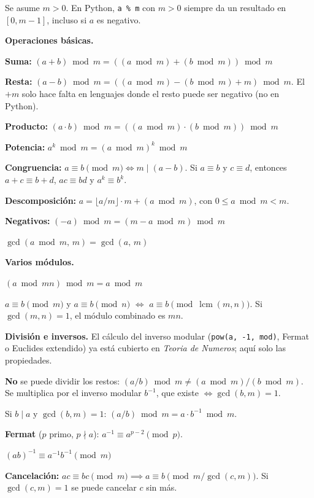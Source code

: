 Se asume \(m > 0\). En Python, \texttt{a \% m} con \(m > 0\) siempre da un resultado en \([0, m-1]\), incluso si \(a\) es negativo.

\textbf{Operaciones básicas.}
\begin{props}
  \item \textbf{Suma:} \((a+b) \bmod m = ((a \bmod m) + (b \bmod m)) \bmod m\)
  \item \textbf{Resta:} \((a-b) \bmod m = ((a \bmod m) - (b \bmod m) + m) \bmod m\). El \(+m\) solo hace falta en lenguajes donde el resto puede ser negativo (no en Python).
  \item \textbf{Producto:} \((a \cdot b) \bmod m = ((a \bmod m) \cdot (b \bmod m)) \bmod m\)
  \item \textbf{Potencia:} \(a^k \bmod m = (a \bmod m)^k \bmod m\)
  \item \textbf{Congruencia:} \(a \equiv b \pmod m \iff m \mid (a-b)\). Si \(a \equiv b\) y \(c \equiv d\), entonces \(a+c \equiv b+d\), \(ac \equiv bd\) y \(a^k \equiv b^k\).
  \item \textbf{Descomposición:} \(a = \lfloor a/m \rfloor \cdot m + (a \bmod m)\), con \(0 \le a \bmod m < m\).
  \item \textbf{Negativos:} \((-a) \bmod m = (m - a \bmod m) \bmod m\)
  \item \(\gcd(a \bmod m,\, m) = \gcd(a,\, m)\)
\end{props}

\textbf{Varios módulos.}
\begin{props}
  \item \((a \bmod mn) \bmod m = a \bmod m\)
  \item \(a \equiv b \pmod m\) y \(a \equiv b \pmod n\) \(\iff\) \(a \equiv b \pmod{\operatorname{lcm}(m,n)}\). Si \(\gcd(m,n)=1\), el módulo combinado es \(mn\).
\end{props}

\textbf{División e inversos.} El cálculo del inverso modular (\texttt{pow(a, -1, mod)}, Fermat o Euclides extendido) ya está cubierto en \textit{Teoria de Numeros}; aquí solo las propiedades.
\begin{props}
  \item \textbf{No} se puede dividir los restos: \((a/b) \bmod m \ne (a \bmod m)/(b \bmod m)\). Se multiplica por el inverso modular \(b^{-1}\), que existe \(\iff \gcd(b,m)=1\).
  \item Si \(b \mid a\) y \(\gcd(b,m)=1\): \((a/b) \bmod m = a \cdot b^{-1} \bmod m\).
  \item \textbf{Fermat} (\(p\) primo, \(p \nmid a\)): \(a^{-1} \equiv a^{p-2} \pmod p\).
  \item \((ab)^{-1} \equiv a^{-1} b^{-1} \pmod m\)
  \item \textbf{Cancelación:} \(ac \equiv bc \pmod m \implies a \equiv b \pmod{m/\gcd(c,m)}\). Si \(\gcd(c,m)=1\) se puede cancelar \(c\) sin más.
\end{props}

